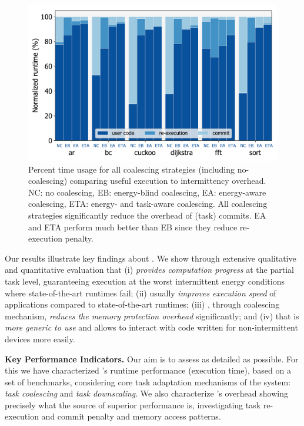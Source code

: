 \begin{figure}
	\centering
	\includegraphics[width=0.5\columnwidth]{figures/coalEfficiency}
	\caption{Percent time usage for all coalescing strategies (including no-coalescing) comparing useful execution to intermittency overhead. NC: no coalescing, EB: energy-blind coalescing, EA: energy-aware coalescing, ETA: energy- and task-aware coalescing. All \sys coalescing strategies significantly reduce the overhead of (task) commits. EA and ETA perform much better than EB since they reduce re-execution penalty. }
	\label{fig:overallOverheadBreakdown}
\end{figure}

Our results illustrate key findings about \sys. We show through extensive qualitative and quantitative evaluation that (i) \sys \emph{provides computation progress} at the partial task level, guaranteeing execution at the worst intermittent energy conditions where state-of-the-art runtimes fail; (ii) usually \emph{improves execution speed} of applications compared to state-of-the-art runtimes; (iii) \sys, through coalescing mechanism, \emph{reduces the memory protection overhead} significantly; and (iv) that \sys is \emph{more generic to use} and allows to interact with code written for non-intermittent devices more easily.

\textbf{Key Performance Indicators.} Our aim is to assess \sys as detailed as possible. For this we have characterized \sys's runtime performance (execution time), based on a set of benchmarks, considering core task adaptation mechanisms of the system: \emph{task coalescing} and \emph{task downscaling}. We also characterize \sys's overhead showing precisely what the source of \sys superior performance is, investigating task re-execution and commit penalty and memory access patterns.

